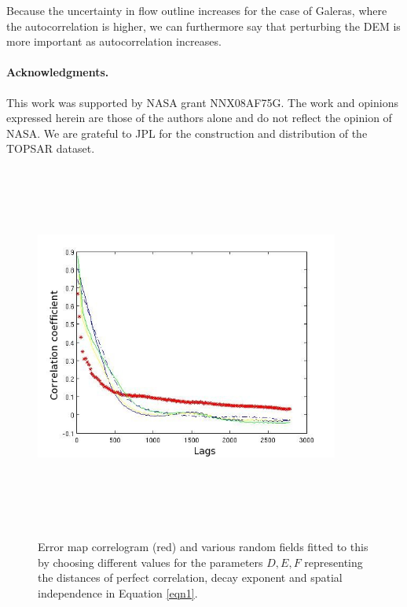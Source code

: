 \documentclass[12pt]{article}
\newcommand{\Pic}[2][0.85]{\begin{center}\texttt{[image: \#2]}
 \end{center} }
\begin{document}
Because the uncertainty in flow outline increases for the case of
Galeras, where the autocorrelation is higher, we can furthermore say
that perturbing the DEM is more important as autocorrelation
increases.

\paragraph{Acknowledgments.}  This work was supported by NASA grant
NNX08AF75G.  The work and opinions expressed herein are those of the
authors alone and do not reflect the opinion of NASA.  We are grateful
to JPL for the construction and distribution of the TOPSAR dataset.

	
		

\begin{figure}[H]
\centering
	\includegraphics[width=10cm,height=12cm,keepaspectratio]{mammoth_error_correl.jpg}\\       
        \caption{ Error map correlogram (red) and various random
          fields fitted to this by choosing different values for the
          parameters $D,E,F$ representing the distances of perfect
          correlation, decay exponent and spatial independence in
          Equation \ref{eqn1}.}
\label{fig1}  
\end{figure}
\end{document}
